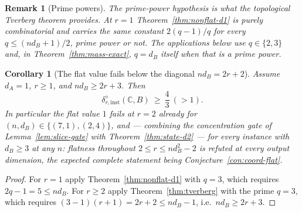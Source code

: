 \documentclass[11pt,a4paper]{article}
\newtheorem{corollary}[theorem]{Corollary}
\newtheorem{remark}[theorem]{Remark}
\begin{document}
\begin{remark}[Prime powers]
\label{rem:prime-powers}
The prime-power hypothesis is what the topological Tverberg theorem provides. At
$r=1$ Theorem~\ref{thm:nonflat-d1} is purely combinatorial and carries the same
constant $2(q-1)/q$ for \emph{every} $q\le(nd_B+1)/2$, prime power or not. The
applications below use $q\in\{2,3\}$ and, in Theorem~\ref{thm:mass-exact}, $q=d_B$
itself when that is a prime power.
\end{remark}

\begin{corollary}[The flat value fails below the diagonal $nd_B=2r+2$]
\label{cor:flat-fails}
Assume $d_A=1$, $r\ge1$, and $nd_B\ge2r+3$. Then
\[
\delta_{r,\mathrm{inst}}^{\diamond}(\mathbb C,B)\ \ge\ \frac43\ (>1).
\]
In particular the flat value $1$ fails at $r=2$ already for $(n,d_B)\in\{(7,1),(2,4)\}$, and --- combining the concentration gate of Lemma~\ref{lem:slice-gate} with Theorem~\ref{thm:state-d2} --- for every instance with $d_B\ge3$ at any $n$: flatness throughout $2\le r\le nd_B^2-2$ is refuted at every output dimension, the expected complete statement being Conjecture~\ref{con:coord-flat}.
\end{corollary}

\begin{proof}
For $r=1$ apply Theorem~\ref{thm:nonflat-d1} with $q=3$, which requires
$2q-1=5\le nd_B$. For $r\ge2$ apply Theorem~\ref{thm:tverberg} with the prime $q=3$,
which requires $(3-1)(r+1)=2r+2\le nd_B-1$, i.e.\ $nd_B\ge2r+3$.
\end{proof}
\end{document}
